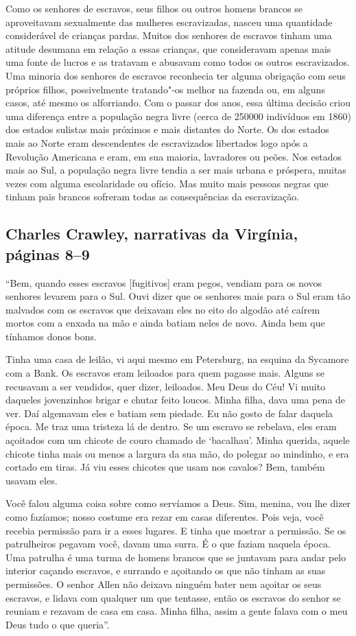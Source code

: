 {Como os senhores de escravos, seus filhos ou outros homens brancos
se aproveitavam sexualmente das mulheres escravizadas, nasceu uma quantidade
considerável de crianças pardas. Muitos dos senhores de escravos tinham
uma atitude desumana em relação a essas crianças, que consideravam
apenas mais uma fonte de lucros e as tratavam e abusavam como todos os
outros escravizados. Uma minoria dos senhores de escravos reconhecia ter
alguma obrigação com seus próprios filhos, possivelmente tratando"-os
melhor na fazenda ou, em alguns casos, até mesmo os alforriando. Com o
passar dos anos, essa última decisão criou uma diferença entre a
população negra livre (cerca de 250000 indivíduos em 1860) dos estados
sulistas mais próximos e mais distantes do Norte. Os dos estados mais ao
Norte eram descendentes de escravizados libertados logo após a Revolução
Americana e eram, em sua maioria, lavradores ou peões. Nos estados mais
ao Sul, a população negra livre tendia a ser mais urbana e próspera,
muitas vezes com alguma escolaridade ou ofício. Mas muito mais pessoas
negras que tinham pais brancos sofreram todas as consequências da
escravização.
}

\subsection{Charles Crawley, narrativas da Virgínia, páginas 8--9} \label{ref61}

``Bem, quando esses escravos {[}fugitivos{]} eram pegos, vendiam para os
novos senhores levarem para o Sul. Ouvi dizer que os senhores mais para
o Sul eram tão malvados com os escravos que deixavam eles no eito do
algodão até caírem mortos com a enxada na mão e ainda batiam neles de
novo. Ainda bem que tínhamos donos bons.

Tinha uma casa de leilão, vi aqui mesmo em Petersburg, na esquina da
Sycamore com a Bank. Os escravos eram leiloados para quem pagasse mais.
Alguns se recusavam a ser vendidos, quer dizer, leiloados. Meu Deus do
Céu! Vi muito daqueles jovenzinhos brigar e chutar feito loucos. Minha
filha, dava uma pena de ver. Daí algemavam eles e batiam sem piedade. Eu
não gosto de falar daquela época. Me traz uma tristeza lá de dentro. Se
um escravo se rebelava, eles eram açoitados com um chicote de couro
chamado de `bacalhau'. Minha querida, aquele chicote tinha mais ou menos
a largura da sua mão, do polegar ao mindinho, e era cortado em tiras. Já
viu esses chicotes que usam nos cavalos? Bem, também usavam eles.

Você falou alguma coisa sobre como servíamos a Deus. Sim, menina, vou
lhe dizer como fazíamos; nosso costume era rezar em casas diferentes.
Pois veja, você recebia permissão para ir a esses lugares. E tinha que
mostrar a permissão. Se os patrulheiros pegavam você, davam uma surra. É
o que faziam naquela época. Uma patrulha é uma turma de homens brancos
que se juntavam para andar pelo interior caçando escravos, e surrando e
açoitando os que não tinham as suas permissões. O senhor Allen não
deixava ninguém bater nem açoitar os seus escravos, e lidava com
qualquer um que tentasse, então os escravos do senhor se reuniam e
rezavam de casa em casa. Minha filha, assim a gente falava com o meu
Deus tudo o que queria''.

